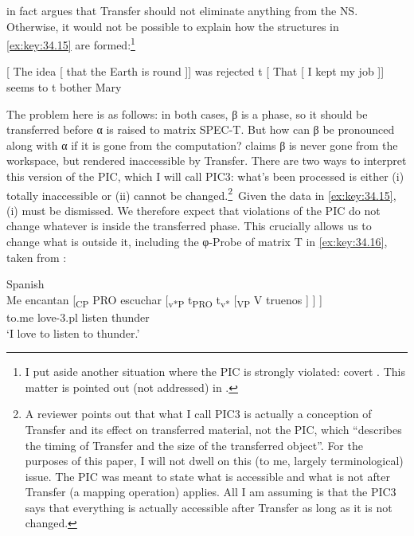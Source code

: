 \documentclass[output=paper]{langsci/langscibook}
\begin{document}
\largerpage
\citet{Chomsky2016} in fact argues that Transfer should not eliminate anything
from the \gls{NS}. Otherwise, it would not be possible to explain how the
structures in \eqref{ex:key:34.15} are formed:\footnote{I put aside another situation where the
    \gls{PIC} is strongly violated: covert . This matter is pointed out
(not addressed) in \textcites[111]{Chomsky2004}[13]{Chomsky2005}.}

\ea%
    \label{ex:key:34.15}
    \ea {}[ The idea [ that the Earth is round ]] was rejected t
    \ex {}[ That [ I kept my job ]] seems to t bother Mary
	\z
\z

The problem here is as follows: in both cases, β is a phase, so it should be
transferred before α is raised to matrix SPEC-T. But how can β be pronounced
along with α if it is gone from the computation? \citet{Chomsky2016} claims β
is never gone from the workspace, but rendered inaccessible by Transfer. There
are two ways to interpret this version of the \gls{PIC}, which I will call PIC3:
what’s been processed is either (i) totally inaccessible or (ii) cannot be
changed.\footnote{A reviewer points out that what I call PIC3 is actually a
    conception of Transfer and its effect on transferred material, not the \gls{PIC},
    which “describes the timing of Transfer and the size of the transferred
    object”. For the purposes of this paper, I will not dwell on this (to me,
    largely terminological) issue. The \gls{PIC} was meant to state what is
    accessible and what is not after Transfer (a mapping operation) applies.
    All I am assuming is that the PIC3 says that everything is actually
accessible after Transfer as long as it is not changed.}~Given the data in
\eqref{ex:key:34.15}, (i) must be dismissed. We therefore expect that violations of the
\gls{PIC} do not change whatever is inside the transferred phase. This
crucially allows us to change what is outside it, including the φ-Probe of
matrix T in \eqref{ex:key:34.16}, taken from \citet{Fernandez-Serrano2016}:

\ea%
    \label{ex:key:34.16}Spanish\\
    \gll Me encantan [\textsubscript{CP} PRO escuchar [\textsubscript{v*P} t\textsubscript{PRO} t\textsubscript{v*} [\textsubscript{VP} V  truenos ] ] ]\\
        to.me love-3.pl {} {} listen {} {} {} {} {} thunder\\
    \glt ‘I love to listen to thunder.’
\z
\end{document}
